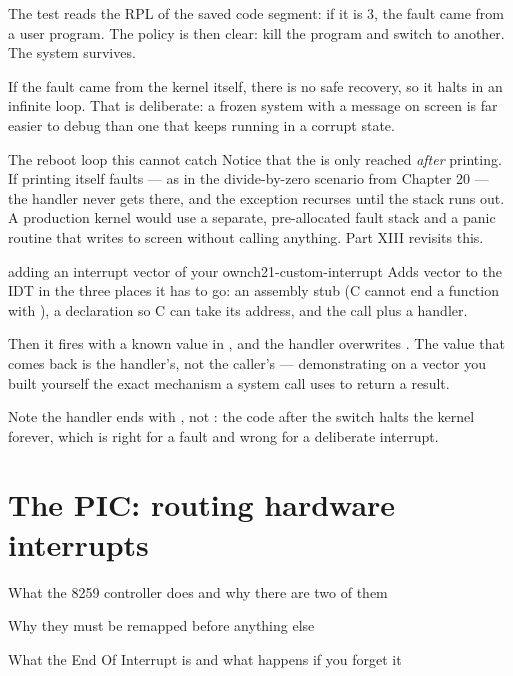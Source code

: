 The test  reads the RPL of the saved code segment: if it is 3, the fault
came from a user program. The policy is then clear: kill the program and switch to another. The
system survives.

If the fault came from the kernel itself, there is no safe recovery, so it halts in an infinite
loop. That is deliberate: a frozen system with a message on screen is far easier to debug than one
that keeps running in a corrupt state.

\begin{warn}{The reboot loop this cannot catch}
Notice that the  is only reached \emph{after} printing. If printing itself faults ---
as in the divide-by-zero scenario from Chapter 20 --- the handler never gets there, and the
exception recurses until the stack runs out. A production kernel would use a separate,
pre-allocated fault stack and a panic routine that writes to screen without calling anything. Part
XIII revisits this.
\end{warn}

\begin{recipe}{adding an interrupt vector of your own}{ch21-custom-interrupt}
Adds vector  to the IDT in the three places it has to go: an assembly stub (C cannot end a
function with ), a declaration so C can take its address, and the 
call plus a handler.

Then it fires  with a known value in , and the handler overwrites
. The value that comes back is the handler's, not the caller's --- demonstrating on
a vector you built yourself the exact mechanism a system call uses to return a result.

Note the handler ends with , not : the code after the switch halts the
kernel forever, which is right for a fault and wrong for a deliberate interrupt.
\end{recipe}

\chapter{The PIC: routing hardware interrupts}

\begin{goals}
  \item What the 8259 controller does and why there are two of them
  \item Why they must be remapped before anything else
  \item What the End Of Interrupt is and what happens if you forget it
\end{goals}

